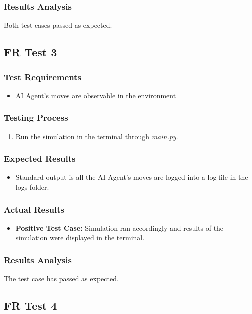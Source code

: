 \documentclass[12pt, titlepage]{article}
\begin{document}
\subsubsection{Results Analysis}
\item Both test cases passed as expected.

\subsection{FR Test 3}
\subsubsection{Test Requirements}
\begin{itemize}
    \item AI Agent's moves are observable in the environment
\end{itemize}
\subsubsection{Testing Process}
\begin{enumerate}
    \item Run the simulation in the terminal through \textit{main.py}.
\end{enumerate}
\subsubsection{Expected Results}
\begin{itemize}
    \item Standard output is all the AI Agent's moves are logged into a log file in the logs folder.
\end{itemize}
\subsubsection{Actual Results}
\begin{itemize}
    \item \textbf{Positive Test Case:} Simulation ran accordingly and results of the simulation were displayed in the terminal.
\end{itemize}
\subsubsection{Results Analysis}
\item The test case has passed as expected.

\subsection{FR Test 4}
\end{document}
